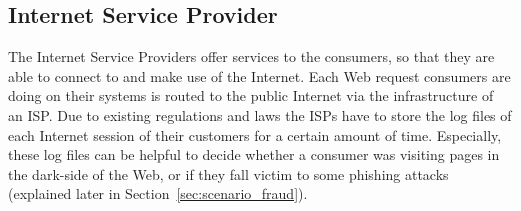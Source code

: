 \subsection{Internet Service Provider}
\label{subsec:stakeholder_isp}

The Internet Service Providers offer services to the consumers, so that they are able to connect to and make use of the Internet. Each Web request consumers are doing on their systems is routed to the public Internet via the infrastructure of an \gls{ISP}. Due to existing regulations and laws the \gls{ISP}s have to store the log files of each Internet session of their customers for a certain amount of time. Especially, these log files can be helpful to decide whether a consumer was visiting pages in the dark-side of the Web, or if they fall victim to some phishing attacks (explained later in Section~\ref{sec:scenario_fraud}).


